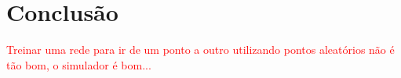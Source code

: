 \chapter{Conclusão}
\textcolor{red}{	Treinar uma rede para ir de um ponto a outro utilizando pontos aleatórios não é tão bom, o simulador é bom...}